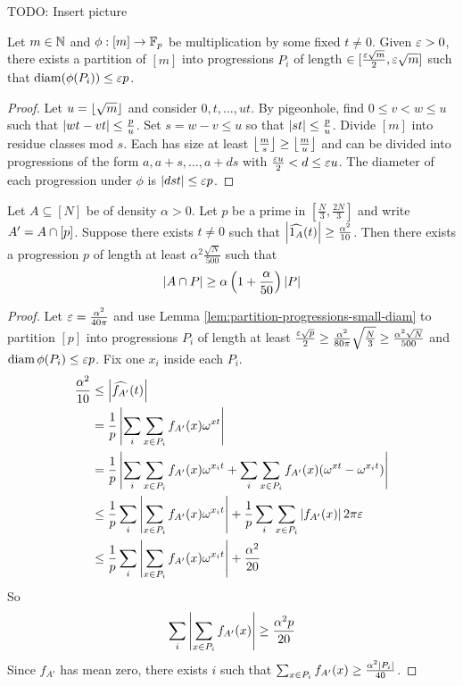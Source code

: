 \documentclass{article}
\begin{document}
TODO: Insert picture

\begin{nlemma}\label{lem:partition-progressions-small-diam}
  Let $m \in \mathbb N$ and $\phi : [m] \to \mathbb F_p$ be multiplication by some fixed $t \ne 0$. Given $\varepsilon > 0$, there exists a partition of $[m]$ into progressions $P_i$ of length $\in [\frac{\varepsilon\sqrt m}2, \varepsilon\sqrt m]$ such that $\operatorname{diam}(\phi(P_i)) \le \varepsilon p$.
\end{nlemma}
\begin{proof}
  Let $u = \left\lfloor \sqrt m\right\rfloor$ and consider $0, t, \dots, ut$. By pigeonhole, find $0 \le v < w \le u$ such that $\left\lvert wt - vt\right\rvert \le \frac pu$. Set $s = w - v \le u$ so that $\left\lvert st\right\rvert \le \frac pu$. Divide $[m]$ into residue classes mod $s$. Each has size at least $\left\lfloor \frac ms\right\rfloor \ge \left\lfloor \frac mu\right\rfloor$ and can be divided into progressions of the form $a, a + s, \dots, a + ds$ with $\frac{\varepsilon u}2 < d \le \varepsilon u$. The diameter of each progression under $\phi$ is $\left\lvert dst\right\rvert \le \varepsilon p$.
\end{proof}

\begin{nlemma}
  Let $A \subseteq [N]$ be of density $\alpha > 0$. Let $p$ be a prime in $[\frac N3, \frac{2N}3]$ and write $A' = A \cap [p]$. Suppose there exists $t \ne 0$ such that $\left\lvert \widehat{1_A}(t)\right\rvert \ge \frac{\alpha^2}{10}$. Then there exists a progression $p$ of length at least $\alpha^2 \frac{\sqrt N}{500}$ such that
  $$\left\lvert A \cap P\right\rvert \ge \alpha\left(1 + \frac\alpha{50}\right)\left\lvert P\right\rvert$$
\end{nlemma}
\begin{proof}
  Let $\varepsilon = \frac{\alpha^2}{40\pi}$ and use Lemma \ref{lem:partition-progressions-small-diam} to partition $[p]$ into progressions $P_i$ of length at least $\frac{\varepsilon \sqrt p}2 \ge \frac{\alpha^2}{80\pi}\sqrt{\frac N3} \ge \frac{\alpha^2\sqrt N}{500}$ and $\operatorname{diam} \phi(P_i) \le \varepsilon p$. Fix one $x_i$ inside each $P_i$.
  \begin{align*}
    \frac{\alpha^2}{10}
    & \le \left\lvert \widehat{f_{A'}}(t)\right\rvert \\
    & = \frac 1p\left\lvert \sum_i\sum_{x \in P_i} f_{A'}(x)\omega^{xt}\right\rvert \\
    & = \frac 1p\left\lvert \sum_i\sum_{x \in P_i} f_{A'}(x)\omega^{x_it} + \sum_i\sum_{x \in P_i} f_{A'}(x)(\omega^{xt} - \omega^{x_it})\right\rvert \\
    & \le \frac 1p\sum_i\left\lvert \sum_{x \in P_i} f_{A'}(x)\omega^{x_it}\right\rvert + \frac 1p\sum_i\sum_{x \in P_i} \left\lvert f_{A'}(x)\right\rvert 2\pi\varepsilon \\
    & \le \frac 1p\sum_i\left\lvert \sum_{x \in P_i} f_{A'}(x)\omega^{x_it}\right\rvert + \frac{\alpha^2}{20}
  \end{align*}
  So
  $$\sum_i \left\lvert \sum_{x \in P_i} f_{A'}(x)\right\rvert \ge \frac{\alpha^2p}{20}$$
  Since $f_{A'}$ has mean zero, there exists $i$ such that $\sum_{x \in P_i} f_{A'}(x) \ge \frac{\alpha^2\left\lvert P_i\right\rvert}{40}$.
\end{proof}
\end{document}
